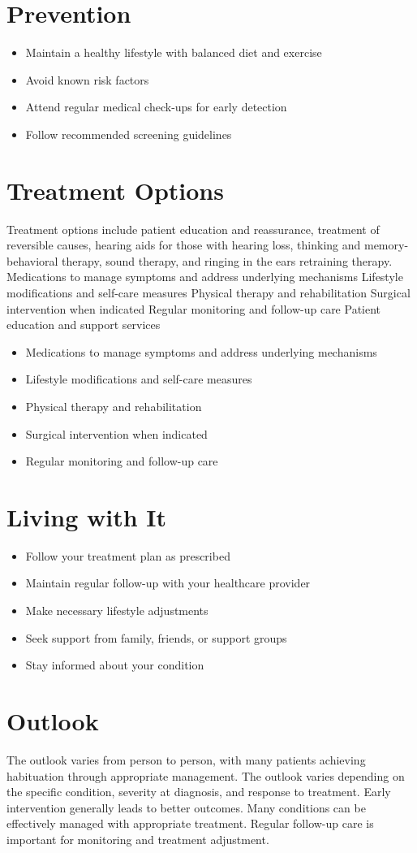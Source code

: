 \section{Prevention}
\begin{itemize}[noitemsep]
  \item Maintain a healthy lifestyle with balanced diet and exercise
  \item Avoid known risk factors
  \item Attend regular medical check-ups for early detection
  \item Follow recommended screening guidelines
\end{itemize}
\section{Treatment Options}
Treatment options include patient education and reassurance, treatment of reversible causes, hearing aids for those with hearing loss, thinking and memory-behavioral therapy, sound therapy, and ringing in the ears retraining therapy. Medications to manage symptoms and address underlying mechanisms Lifestyle modifications and self-care measures Physical therapy and rehabilitation Surgical intervention when indicated Regular monitoring and follow-up care Patient education and support services

\begin{itemize}[noitemsep]
  \item Medications to manage symptoms and address underlying mechanisms
  \item Lifestyle modifications and self-care measures
  \item Physical therapy and rehabilitation
  \item Surgical intervention when indicated
  \item Regular monitoring and follow-up care
\end{itemize}
\section{Living with It}
\begin{itemize}[noitemsep]
  \item Follow your treatment plan as prescribed
  \item Maintain regular follow-up with your healthcare provider
  \item Make necessary lifestyle adjustments
  \item Seek support from family, friends, or support groups
  \item Stay informed about your condition
\end{itemize}
\section{Outlook}
The outlook varies from person to person, with many patients achieving habituation through appropriate management. The outlook varies depending on the specific condition, severity at diagnosis, and response to treatment. Early intervention generally leads to better outcomes. Many conditions can be effectively managed with appropriate treatment. Regular follow-up care is important for monitoring and treatment adjustment.
